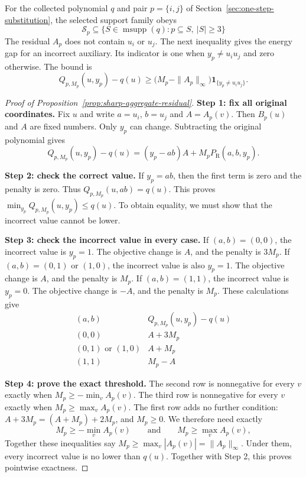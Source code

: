 \documentclass[a4paper,onecolumn,11pt,unpublished]{quantumarticle}
\theoremstyle{remark}
\begin{document}
For the collected polynomial $q$ and pair $p=\{i,j\}$ of
Section~\ref{sec:one-step-substitution}, the selected support family obeys
\begin{equation}
  \mathcal{S}_p\subseteq
  \{S\in\operatorname{msupp}(q):p\subseteq S,\ |S|\geq3\}
  \label{eq:selected-family-one-step}
\end{equation}
The residual $A_p$ does not contain $u_i$ or $u_j$.
The next inequality gives the energy gap for an incorrect auxiliary.
Its indicator is one when $y_p\neq u_i u_j$ and zero otherwise.
The bound is
\begin{equation}
  Q_{p,M_p}(u,y_p)-q(u)
  \geq
  \bigl(M_p-\|A_p\|_\infty\bigr)
  \mathbf{1}_{\{y_p\neq u_i u_j\}}.
  \label{eq:one-step-margin}
\end{equation}

\begin{proof}[Proof of Proposition~\ref{prop:sharp-aggregate-residual}]
\textbf{Step 1: fix all original coordinates.}
Fix $u$ and write $a=u_i$, $b=u_j$ and $A=A_p(v)$.
Then $B_p(u)$ and $A$ are fixed numbers. Only $y_p$ can change.
Subtracting the original polynomial gives
\[
Q_{p,M_p}(u,y_p)-q(u)
=(y_p-ab)A+M_pP_{\mathrm R}(a,b,y_p).
\]

\textbf{Step 2: check the correct value.}
If $y_p=ab$, then the first term is zero and the penalty is zero.
Thus $Q_{p,M_p}(u,ab)=q(u)$.
This proves $\min_{y_p}Q_{p,M_p}(u,y_p)\leq q(u)$.
To obtain equality, we must show that the incorrect value cannot be lower.

\textbf{Step 3: check the incorrect value in every case.}
If $(a,b)=(0,0)$, the incorrect value is $y_p=1$.
The objective change is $A$, and the penalty is $3M_p$.
If $(a,b)=(0,1)$ or $(1,0)$, the incorrect value is also $y_p=1$.
The objective change is $A$, and the penalty is $M_p$.
If $(a,b)=(1,1)$, the incorrect value is $y_p=0$.
The objective change is $-A$, and the penalty is $M_p$.
These calculations give
\begin{equation}
\begin{array}{c|c}
 (a,b) & Q_{p,M_p}(u,y_p)-q(u) \\ \hline
 (0,0) & A+3M_p \\
 (0,1)\text{ or }(1,0) & A+M_p \\
 (1,1) & M_p-A
\end{array}
\label{eq:inconsistent-excess-table}
\end{equation}

\textbf{Step 4: prove the exact threshold.}
The second row is nonnegative for every $v$ exactly when
$M_p\geq-\min_vA_p(v)$.
The third row is nonnegative for every $v$ exactly when
$M_p\geq\max_vA_p(v)$.
The first row adds no further condition: $A+3M_p=(A+M_p)+2M_p$, and
$M_p\geq0$.
We therefore need exactly
\begin{equation}
  M_p\geq-\min_vA_p(v)
  \qquad\text{and}\qquad
  M_p\geq\max_vA_p(v),
\end{equation}
Together these inequalities say $M_p\geq\max_v|A_p(v)|=\|A_p\|_\infty$.
Under them, every incorrect value is no lower than $q(u)$.
Together with Step 2, this proves pointwise exactness.


\end{proof}
\end{document}
